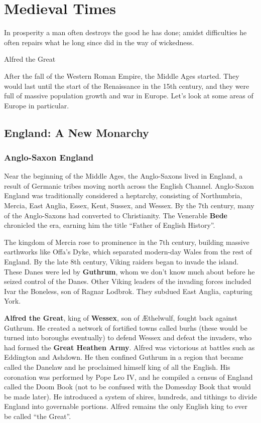 \chapter{Medieval Times}

\epigraph{%
  In prosperity a man often destroys the good he has done;
  amidst difficulties he often repairs what he long since did in the way of wickedness.
}{Alfred the Great}

After the fall of the Western Roman Empire, the Middle Ages started.
They would last until the start of the Renaissance in the 15th century,
and they were full of massive population growth and war in Europe.
Let's look at some areas of Europe in particular.

\section{England: A New Monarchy}

\subsection*{Anglo-Saxon England}

Near the beginning of the Middle Ages, the Anglo-Saxons lived in England,
a result of Germanic tribes moving north across the English Channel.
Anglo-Saxon England was traditionally considered a heptarchy, consisting of
Northumbria, Mercia, East Anglia, Essex, Kent, Sussex, and Wessex.
By the 7th century, many of the Anglo-Saxons had converted to Christianity.
The Venerable \textbf{Bede} chronicled the era, earning him the title ``Father of English History''.

The kingdom of Mercia rose to prominence in the 7th century,
building massive earthworks like Offa's Dyke,
which separated modern-day Wales from the rest of England.
By the late 8th century, Viking raiders began to invade the island.
These Danes were led by \textbf{Guthrum},
whom we don't know much about before he seized control of the Danes.
Other Viking leaders of the invading forces included Ivar the Boneless, son of Ragnar Lodbrok.
They subdued East Anglia, capturing York.

\textbf{Alfred the Great}, king of \textbf{Wessex}, son of \AE{}thelwulf,
fought back against Guthrum.
He created a network of fortified towns called burhs
(these would be turned into boroughs eventually)
to defend Wessex and defeat the invaders, who had formed the \textbf{Great Heathen Army}.
Alfred was victorious at battles such as Eddington and Ashdown.
He then confined Guthrum in a region that became called the Danelaw
and he proclaimed himself king of all the English.
His coronation was performed by Pope Leo IV,
and he compiled a census of England called the Doom Book
(not to be confused with the Domesday Book that would be made later).
He introduced a system of shires, hundreds, and tithings to divide England into governable portions.
Alfred remains the only English king to ever be called ``the Great''.

